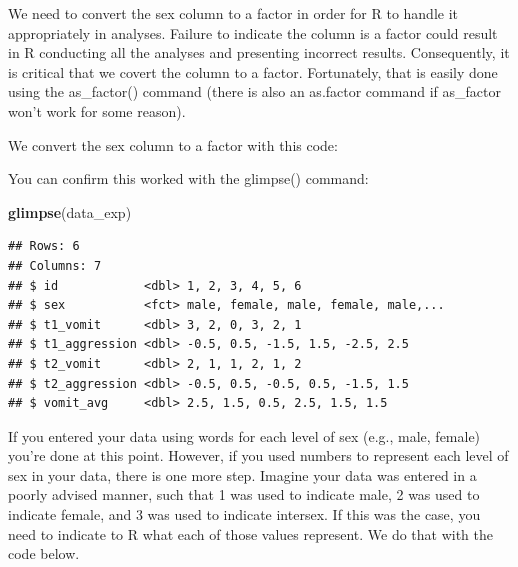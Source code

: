 \documentclass[
]{krantz}
\makeatletter
\newenvironment{Shaded}{\begin{snugshade}}{\end{snugshade}}
\newcommand{\DataTypeTok}[1]{\textcolor[rgb]{0.27,0.27,0.27}{#1}}
\newcommand{\KeywordTok}[1]{\textcolor[rgb]{0.27,0.27,0.27}{\textbf{#1}}}
\newcommand{\NormalTok}[1]{#1}
\newcommand{\OperatorTok}[1]{\textcolor[rgb]{0.43,0.43,0.43}{\textbf{#1}}}
\newcommand{\StringTok}[1]{\textcolor[rgb]{0.5,0.5,0.5}{#1}}
\newenvironment{kframe}{%
\medskip{}
\setlength{\fboxsep}{.8em}
 \def\at@end@of@kframe{}%
 \ifinner\ifhmode%
  \def\at@end@of@kframe{\end{minipage}}%
  \begin{minipage}{\columnwidth}%
 \fi\fi%
 \def\FrameCommand##1{\hskip\@totalleftmargin \hskip-\fboxsep
 \colorbox{shadecolor}{##1}\hskip-\fboxsep
     \hskip-\linewidth \hskip-\@totalleftmargin \hskip\columnwidth}%
 \MakeFramed {\advance\hsize-\width
   \@totalleftmargin\z@ \linewidth\hsize
   \@setminipage}}%
 {\par\unskip\endMakeFramed%
 \at@end@of@kframe}
\renewenvironment{Shaded}{\begin{kframe}}{\end{kframe}}
\makeatother
\begin{document}
We need to convert the sex column to a factor in order for R to handle it appropriately in analyses. Failure to indicate the column is a factor could result in R conducting all the analyses and presenting incorrect results. Consequently, it is critical that we covert the column to a factor. Fortunately, that is easily done using the as\_factor() command (there is also an as.factor command if as\_factor won't work for some reason).

We convert the sex column to a factor with this code:

\begin{Shaded}
\end{Shaded}

You can confirm this worked with the glimpse() command:

\begin{Shaded}
\begin{Highlighting}[]
\KeywordTok{glimpse}\NormalTok{(data_exp)}
\end{Highlighting}
\end{Shaded}

\begin{verbatim}
## Rows: 6
## Columns: 7
## $ id            <dbl> 1, 2, 3, 4, 5, 6
## $ sex           <fct> male, female, male, female, male,...
## $ t1_vomit      <dbl> 3, 2, 0, 3, 2, 1
## $ t1_aggression <dbl> -0.5, 0.5, -1.5, 1.5, -2.5, 2.5
## $ t2_vomit      <dbl> 2, 1, 1, 2, 1, 2
## $ t2_aggression <dbl> -0.5, 0.5, -0.5, 0.5, -1.5, 1.5
## $ vomit_avg     <dbl> 2.5, 1.5, 0.5, 2.5, 1.5, 1.5
\end{verbatim}

If you entered your data using words for each level of sex (e.g., male, female) you're done at this point. However, if you used numbers to represent each level of sex in your data, there is one more step. Imagine your data was entered in a poorly advised manner, such that 1 was used to indicate male, 2 was used to indicate female, and 3 was used to indicate intersex. If this was the case, you need to indicate to R what each of those values represent. We do that with the code below.

\begin{Shaded}
\end{Shaded}
\end{document}
